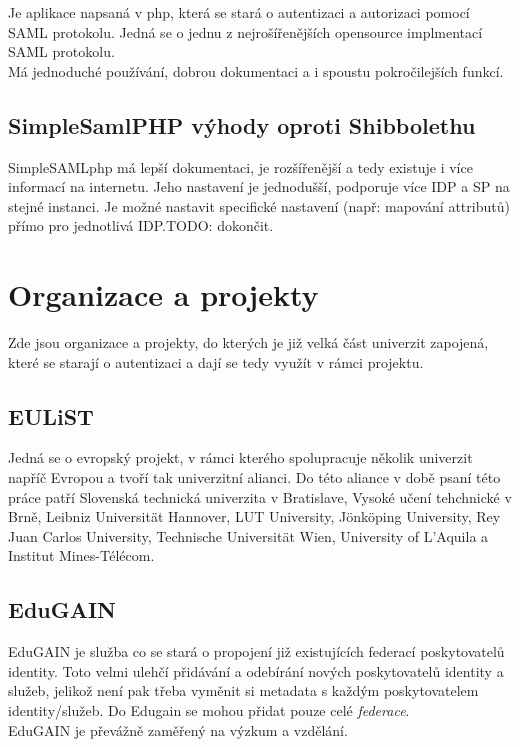 Je aplikace napsaná v php, která se stará o autentizaci a autorizaci pomocí SAML protokolu. Jedná se o jednu z nejrošířenějších opensource implmentací SAML protokolu.\\

Má jednoduché používání, dobrou dokumentaci a i spoustu pokročilejších funkcí.

\section{SimpleSamlPHP výhody oproti Shibbolethu} %

SimpleSAMLphp má lepší dokumentaci, je rozšířenější a tedy existuje i více informací na internetu. Jeho nastavení je jednodušší, podporuje více IDP a SP na stejné instanci. Je možné nastavit specifické nastavení (např: mapování attributů) přímo pro jednotlivá IDP.TODO: dokončit.

\chapter{Organizace a projekty} %

Zde jsou organizace a projekty, do kterých je již velká část univerzit zapojená, které se starají o autentizaci a dají se tedy využít v rámci projektu.

\section{EULiST} %
Jedná se o evropský projekt, v rámci kterého spolupracuje několik univerzit napříč Evropou a tvoří tak univerzitní alianci. Do této aliance v době psaní této práce patří Slovenská technická univerzita v Bratislave, Vysoké učení tehchnické v Brně,  Leibniz Universität Hannover, LUT University, Jönköping University, Rey Juan Carlos University, Technische Universität Wien, University of L’Aquila a Institut Mines-Télécom.


\section{EduGAIN} %

EduGAIN je služba co se stará o propojení již existujících federací poskytovatelů identity. Toto velmi ulehčí přidávání a odebírání nových poskytovatelů identity a služeb, jelikož není pak třeba vyměnit si metadata s každým poskytovatelem identity/služeb. Do Edugain se mohou přidat pouze celé \emph{federace}. \\%
EduGAIN je převážně zaměřený na výzkum a vzdělání.


